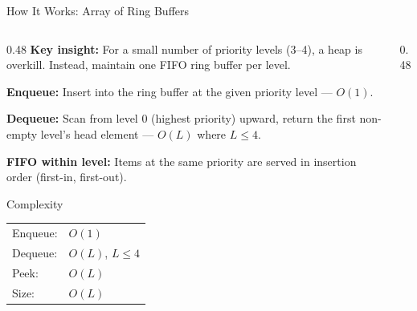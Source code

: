 \documentclass[aspectratio=169, 10pt]{beamer}
\begin{document}
\begin{frame}{How It Works: Array of Ring Buffers}
\begin{columns}[T]
\begin{column}{0.48\textwidth}
\textbf{Key insight:} For a small number of priority levels (3--4),
a heap is overkill. Instead, maintain one FIFO ring buffer per level.

\vspace{0.5em}
\textbf{Enqueue:} Insert into the ring buffer at the given priority level --- $O(1)$.

\vspace{0.5em}
\textbf{Dequeue:} Scan from level 0 (highest priority) upward, return
the first non-empty level's head element --- $O(L)$ where $L \leq 4$.

\vspace{0.5em}
\textbf{FIFO within level:} Items at the same priority are served
in insertion order (first-in, first-out).

\vspace{0.5em}
\begin{block}{Complexity}
\begin{tabular}{@{}ll@{}}
Enqueue: & $O(1)$ \\
Dequeue: & $O(L)$, $L \leq 4$ \\
Peek:    & $O(L)$ \\
Size:    & $O(L)$ \\
\end{tabular}
\end{block}
\end{column}

\begin{column}{0.48\textwidth}
\begin{center}
\end{center}
\end{column}
\end{columns}
\end{frame}
\end{document}
